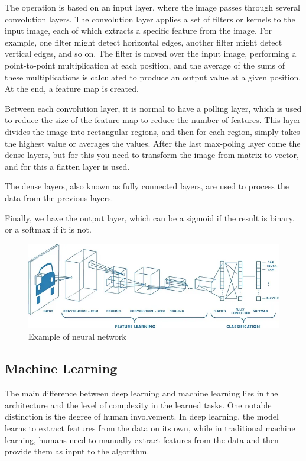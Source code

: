 The operation is based on an input layer, where the image passes through several convolution layers.
The convolution layer applies a set of filters or kernels to the input image, each of which extracts a specific feature from the image. For example, one filter might detect horizontal edges, another filter might detect vertical edges, and so on. The filter is moved over the input image, performing a point-to-point multiplication at each position, and the average of the sums of these multiplications is calculated to produce an output value at a given position. At the end, a feature map is created.

Between each convolution layer, it is normal to have a polling layer, which is used to reduce the size of the feature map to reduce the number of features. This layer divides the image into rectangular regions, and then for each region, simply takes the highest value or averages the values.
After the last max-poling layer come the dense layers, but for this you need to transform the image from matrix to vector, and for this a flatten layer is used.

The dense layers, also known as fully connected layers, are used to process the data from the previous layers.

Finally, we have the output layer, which can be a sigmoid if the result is binary, or a softmax if it is not.

\begin{figure}[H]
\centering
\includegraphics[width=15cm]{images/cnn.png}
\caption[Example of neural network]{Example of neural network \cite{mediumCNN}}
\end{figure}

\subsection{Machine Learning}
The main difference between deep learning and machine learning lies in the architecture and the level of complexity in the learned tasks. One notable distinction is the degree of human involvement. In deep learning, the model learns to extract features from the data on its own, while in traditional machine learning, humans need to manually extract features from the data and then provide them as input to the algorithm.

